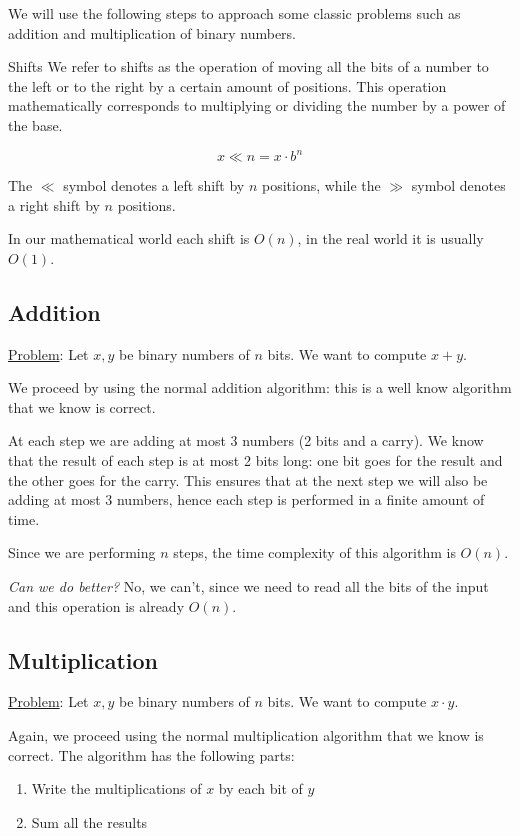 \documentclass[10pt]{extarticle}
\begin{document}
We will use the following steps to approach some classic problems such as addition and multiplication of binary numbers.

\begin{notebox}{Shifts}
    We refer to shifts as the operation of moving all the bits of a number to the left or to the right by a certain amount of positions.
    This operation mathematically corresponds to multiplying or dividing the number by a power of the base.

    $$
        x \ll n = x \cdot b^n
    $$

    The $\ll$ symbol denotes a left shift by $n$ positions, while the $\gg$ symbol denotes a right shift by $n$ positions.

    In our mathematical world each shift is $O(n)$, in the real world it is usually $O(1)$.
\end{notebox}

\subsection{Addition}

\underline{Problem}: Let $x, y$ be binary numbers of $n$ bits. We want to compute $x + y$.

We proceed by using the normal addition algorithm: this is a well know algorithm that we know is correct.

At each step we are adding at most 3 numbers (2 bits and a carry).
We know that the result of each step is at most 2 bits long: one bit goes for the result and the other goes for the carry.
This ensures that at the next step we will also be adding at most 3 numbers, hence each step is performed in a finite amount of time.

Since we are performing $n$ steps, the time complexity of this algorithm is $O(n)$.

\textit{Can we do better?} No, we can't, since we need to read all the bits of the input and this operation is already $O(n)$.

\subsection{Multiplication}

\underline{Problem}: Let $x, y$ be binary numbers of $n$ bits. We want to compute $x \cdot y$.

Again, we proceed using the normal multiplication algorithm that we know is correct.
The algorithm has the following parts:
\begin{enumerate}
    \item Write the multiplications of $x$ by each bit of $y$
    \item Sum all the results
\end{enumerate}
\end{document}
